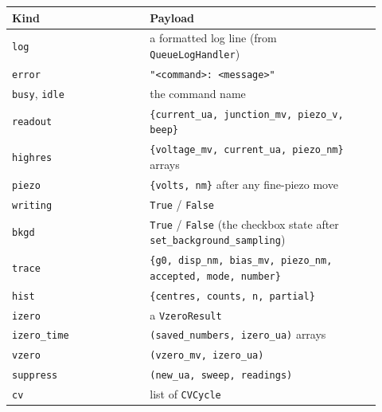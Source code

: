 \small\setlength{\LTleft}{0pt}\setlength{\LTright}{\fill}
\begin{longtable}{@{}>{\raggedright\arraybackslash}p{0.34\linewidth}>{\raggedright\arraybackslash}p{0.58\linewidth}@{}}
\toprule
\textbf{Kind} & \textbf{Payload} \\
\midrule\endhead
\texttt{log} & a formatted log line (from \texttt{Queue\discretionary{}{}{}Log\discretionary{}{}{}Handler}) \\
\texttt{error} & \texttt{"<command>: <message>"} \\
\texttt{busy}, \texttt{idle} & the command name \\
\texttt{readout} & \texttt{\{current\_\discretionary{}{}{}ua,\discretionary{}{}{} junction\_\discretionary{}{}{}mv,\discretionary{}{}{} piezo\_\discretionary{}{}{}v,\discretionary{}{}{} beep\}} \\
\texttt{highres} & \texttt{\{voltage\_\discretionary{}{}{}mv,\discretionary{}{}{} current\_\discretionary{}{}{}ua,\discretionary{}{}{} piezo\_\discretionary{}{}{}nm\}} arrays \\
\texttt{piezo} & \texttt{\{volts,\discretionary{}{}{} nm\}} after any fine-piezo move \\
\texttt{writing} & \texttt{True} / \texttt{False} \\
\texttt{bkgd} & \texttt{True} / \texttt{False} (the checkbox state after \texttt{set\_\discretionary{}{}{}background\_\discretionary{}{}{}sampling}) \\
\texttt{trace} & \texttt{\{g0,\discretionary{}{}{} disp\_\discretionary{}{}{}nm,\discretionary{}{}{} bias\_\discretionary{}{}{}mv,\discretionary{}{}{} piezo\_\discretionary{}{}{}nm,\discretionary{}{}{} accepted,\discretionary{}{}{} mode,\discretionary{}{}{} number\}} \\
\texttt{hist} & \texttt{\{centres,\discretionary{}{}{} counts,\discretionary{}{}{} n,\discretionary{}{}{} partial\}} \\
\texttt{izero} & a \texttt{Vzero\discretionary{}{}{}Result} \\
\texttt{izero\_\discretionary{}{}{}time} & \texttt{(saved\_\discretionary{}{}{}numbers,\discretionary{}{}{} izero\_\discretionary{}{}{}ua)} arrays \\
\texttt{vzero} & \texttt{(vzero\_\discretionary{}{}{}mv,\discretionary{}{}{} izero\_\discretionary{}{}{}ua)} \\
\texttt{suppress} & \texttt{(new\_\discretionary{}{}{}ua,\discretionary{}{}{} sweep,\discretionary{}{}{} readings)} \\
\texttt{cv} & list of \texttt{CVCycle} \\

\end{longtable}

